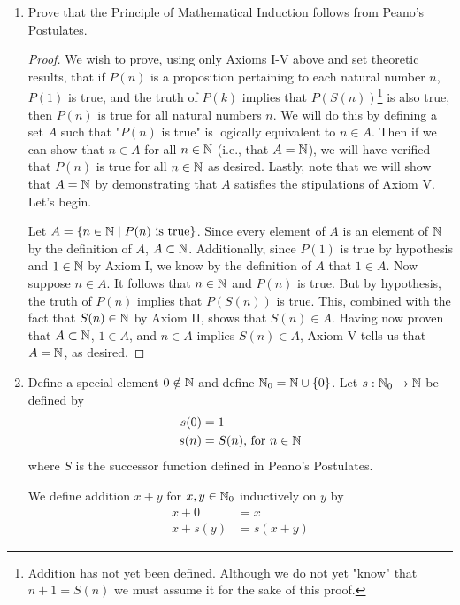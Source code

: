 \documentclass[../main.tex]{subfiles}
\begin{document}
\begin{enumerate}
\begin{enumerate}[label={(\alph*)}]
\begin{proof}
        \end{proof}
        \item Prove that the Principle of Mathematical Induction follows from Peano's Postulates.
        \begin{proof}
            We wish to prove, using only Axioms I-V above and set theoretic results, that if $P(n)$ is a proposition pertaining to each natural number $n$, $P(1)$ is true, and the truth of $P(k)$ implies that $P(S(n))$\footnote{Addition has not yet been defined. Although we do not yet "know" that $n+1=S(n)$ we must assume it for the sake of this proof.} is also true, then $P(n)$ is true for all natural numbers $n$. We will do this by defining a set $A$ such that "$P(n)$ is true" is logically equivalent to $n\in A$. Then if we can show that $n\in A$ for all $n\in\mathbb{N}$ (i.e., that $A=\mathbb{N}$), we will have verified that $P(n)$ is true for all $n\in\mathbb{N}$ as desired. Lastly, note that we will show that $A=\mathbb{N}$ by demonstrating that $A$ satisfies the stipulations of Axiom V. Let's begin.\par
            Let $A=\{n\in\mathbb{N}\mid P(n)\text{ is true}\}$. Since every element of $A$ is an element of $\mathbb{N}$ by the definition of $A$, $A\subset\mathbb{N}$. Additionally, since $P(1)$ is true by hypothesis and $1\in\mathbb{N}$ by Axiom I, we know by the definition of $A$ that $1\in A$. Now suppose $n\in A$. It follows that $n\in\mathbb{N}$ and $P(n)$ is true. But by hypothesis, the truth of $P(n)$ implies that $P(S(n))$ is true. This, combined with the fact that $S(n)\in\mathbb{N}$ by Axiom II, shows that $S(n)\in A$. Having now proven that $A\subset\mathbb{N}$, $1\in A$, and $n\in A$ implies $S(n)\in A$, Axiom V tells us that $A=\mathbb{N}$, as desired.
        \end{proof}
        \item Define a special element $0\notin\mathbb{N}$ and define $\mathbb{N}_0=\mathbb{N}\cup\{0\}$. Let $s:\mathbb{N}_0\to\mathbb{N}$ be defined by
        \begin{align*}
            s(0) &= 1\\
            s(n) &= S(n)\text{, for }n\in\mathbb{N}
        \end{align*}
        where $S$ is the successor function defined in Peano's Postulates.
        \begin{definition*}
            We define addition $x+y$ for $x,y\in\mathbb{N}_0$ inductively on $y$ by
            \begin{align*}
                x+0 &= x\\
                x+s(y) &= s(x+y)
            \end{align*}
        \end{definition*}

\end{enumerate}
\end{enumerate}
\end{document}
